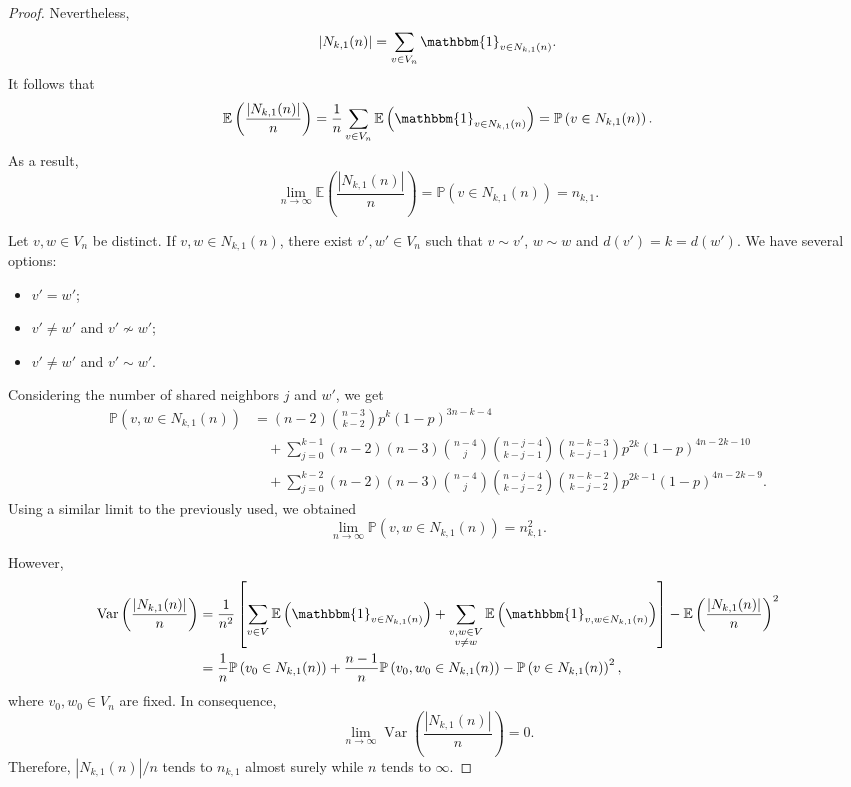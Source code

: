 \documentclass[a4paper]{article}
\newcommand{\abs}[1]{\left\lvert#1\right\rvert}
\newcommand{\Pp}[1]{\mathbb{P}\left(#1\right)}
\newcommand{\E}[1]{\mathbb{E}\left(#1\right)}
\DeclareMathOperator{\var}{Var}
\newcommand{\Var}[1]{\var\left(#1\right)}
\theoremstyle{plain}
\begin{document}
\begin{proof}
    Nevertheless,
    \[
        \abs{N_{k,1}(n)} = \sum_{v \in V_n} \mathbbm{1}_{v \in N_{k,1}(n)}.
    \]
    It follows that
    \[
        \E{\frac{\abs{N_{k,1}(n)}}{n}} = \frac{1}{n}\sum_{v \in V_n} \E{\mathbbm{1}_{v \in N_{k,1}(n)}} = \Pp{v \in N_{k,1}(n)}.
    \]
    As a result,
    \[
        \lim_{n \to \infty} \E{\frac{\abs{N_{k,1}(n)}}{n}} = \Pp{v \in N_{k,1}(n)} = n_{k,1}.
    \]

    Let \(v,w \in V_n\) be distinct. If \(v, w \in N_{k,1}(n)\), there exist \(v',w' \in V_n\) such that \(v \sim v'\), \(w \sim w\) and \(d(v') = k = d(w')\). We have several options:
    \begin{itemize}
        \item \(v' = w'\);
        \item \(v' \neq w'\) and \(v' \not\sim w'\);
        \item \(v' \neq w'\) and \(v' \sim w'\).
    \end{itemize}
    Considering the number of shared neighbors \(j\) and \(w'\), we get
    \begin{align*}
        \Pp{v,w \in N_{k,1}(n)} &= (n-2)\binom{n-3}{k-2}p^k(1-p)^{3n-k-4}\\
        &\quad + \sum_{j = 0}^{k-1} (n-2)(n-3)\binom{n-4}{j}\binom{n-j-4}{k-j-1}\binom{n-k-3}{k-j-1}p^{2k}(1-p)^{4n-2k-10}\\
        &\quad + \sum_{j = 0}^{k-2} (n-2)(n-3)\binom{n-4}{j}\binom{n-j-4}{k-j-2}\binom{n-k-2}{k-j-2}p^{2k-1}(1-p)^{4n-2k-9}.
    \end{align*}
    Using a similar limit to the previously used, we obtained
    \[
        \lim_{n \to \infty} \Pp{v,w \in N_{k,1}(n)} = n_{k,1}^2.
    \]

    However,
    \begin{align*}
        \Var{\frac{\abs{N_{k,1}(n)}}{n}} &= \frac{1}{n^2}\left[\sum_{v \in V}\E{\mathbbm{1}_{v \in N_{k,1}(n)}} + \sum_{\substack{v,w \in V\\
        v \neq w}} \E{\mathbbm{1}_{v, w \in N_{k,1}(n)}}\right] - \E{\frac{\abs{N_{k,1}(n)}}{n}}^2\\
        &= \frac{1}{n}\Pp{v_0 \in N_{k,1}(n)} + \frac{n-1}{n}\Pp{v_0,w_0 \in N_{k,1}(n)} - \Pp{v \in N_{k,1}(n)}^2,
    \end{align*}
    where \(v_0,w_0 \in V_n\) are fixed. In consequence,
    \[
        \lim_{n \to \infty} \Var{\frac{\abs{N_{k,1}(n)}}{n}} = 0.
    \]
    Therefore, \(\abs{N_{k,1}(n)}/n\) tends to \(n_{k,1}\) almost surely while \(n\) tends to \(\infty\).
    
\end{proof}
\end{document}
